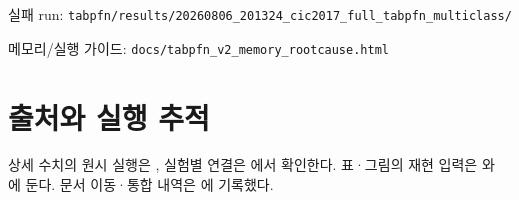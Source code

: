 \par\noindent \textbullet\enspace 실패 run: \texttt{tabpfn/\allowbreak{}\allowbreak{}r\allowbreak{}esults/\allowbreak{}\allowbreak{}2\allowbreak{}0260806\_\allowbreak{}\allowbreak{}201324\_\allowbreak{}\allowbreak{}c\allowbreak{}ic2017\_\allowbreak{}\allowbreak{}f\allowbreak{}ull\_\allowbreak{}\allowbreak{}tabp\allowbreak{}fn\_\allowbreak{}\allowbreak{}multi\allowbreak{}class/\allowbreak{}\allowbreak{}}


\par\noindent \textbullet\enspace 메모리/\allowbreak{}실행 가이드: \texttt{docs/\allowbreak{}\allowbreak{}tab\allowbreak{}pfn\_\allowbreak{}\allowbreak{}v2\_\allowbreak{}\allowbreak{}m\allowbreak{}emory\_\allowbreak{}\allowbreak{}ro\allowbreak{}otcause.\allowbreak{}html}




\section*{출처와 실행 추적}

상세 수치의 원시 실행은 , 실험별 연결은 에서 확인한다. 표·그림의 재현 입력은 와 에 둔다. 문서 이동·통합 내역은 에 기록했다.


